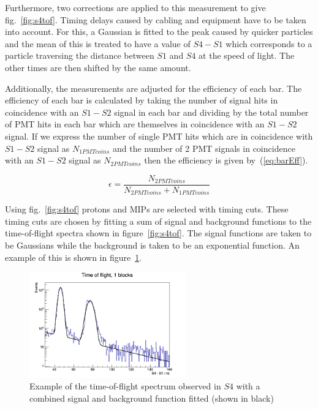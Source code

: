 	Furthermore, two corrections are applied to this measurement to give fig.~\ref{fig:s4tof}. Timing delays caused by cabling and equipment have to be taken into account. For this, a Gaussian is fitted to the peak caused by quicker particles and the mean of this is treated to have a value of $S4 - S1$ which corresponds to a particle traversing the distance between $S1$ and $S4$ at the speed of light. The other times are then shifted by the same amount.
	
	Additionally, the measurements are adjusted for the efficiency of each bar. The efficiency of each bar is calculated by taking the number of signal hits in coincidence with an $S1-S2$ signal in each bar and dividing by the total number of PMT hits in each bar which are themselves in coincidence with an $S1-S2$ signal. If we express the number of single PMT hits which are in coincidence with $S1-S2$ signal as $N_{1PMTcoins}$ and the number of 2 PMT signals in coincidence with an $S1-S2$ signal as $N_{2PMTcoins}$ then the efficiency is given by~(\ref{eq:barEff}).
	
	\begin{equation}
		\epsilon = \frac{N_{2PMTcoins}}{N_{2PMTcoins}+N_{1PMTcoins}}
		\label{eq:barEff}
	\end{equation}
	
	Using fig.~\ref{fig:s4tof} protons and MIPs are selected with timing cuts. These timing cuts are chosen by fitting a sum of signal and background functions to the time-of-flight spectra shown in figure~\ref{fig:s4tof}. The signal functions are taken to be Gaussians while the background is taken to be an exponential function. An example of this is shown in figure~\ref{fig:fitEx}.
	
	\begin{figure}[h]
		\centering
		\includegraphics[width=0.6\textwidth]{files/Figures/1_dtof1d}
		\caption{Example of the time-of-flight spectrum observed in $S4$ with a combined signal and background function fitted (shown in black)}
		\label{fig:fitEx}
	\end{figure}